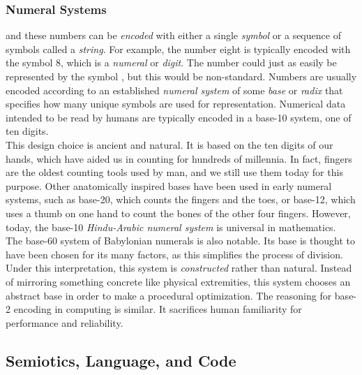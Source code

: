 \subsubsection{Numeral Systems}

and these numbers can be \textit{encoded} with either a single \textit{symbol} or a sequence of symbols called a \textit{string}. For example, the number eight is typically encoded with the symbol 8, which is a \textit{numeral} or \textit{digit}. The number could just as easily be represented by the symbol \varstigma, but this would be non-standard. Numbers are usually encoded according to an established \textit{numeral system} of some \textit{base} or \textit{radix} that specifies how many unique symbols are used for representation. Numerical data intended to be read by humans are typically encoded in a base-10 system, one of ten digits. \\

This design choice is ancient and natural. It is based on the ten digits of our hands, which have aided us in counting for hundreds of millennia. In fact, fingers are the oldest counting tools used by man, and we still use them today for this purpose. Other anatomically inspired bases have been used in early numeral systems, such as base-20, which counts the fingers and the toes, or base-12, which uses a thumb on one hand to count the bones of the other four fingers. However, today, the base-10 \textit{Hindu-Arabic numeral system} is universal in mathematics. \\

The base-60 system of Babylonian numerals is also notable. Its base is thought to have been chosen for its many factors, as this simplifies the process of division. Under this interpretation, this system is \textit{constructed} rather than natural. Instead of mirroring something concrete like physical extremities, this system chooses an abstract base in order to make a procedural optimization. The reasoning for base-2 encoding in computing is similar. It sacrifices human familiarity for performance and reliability. \\


\subsection{Semiotics, Language, and Code}


